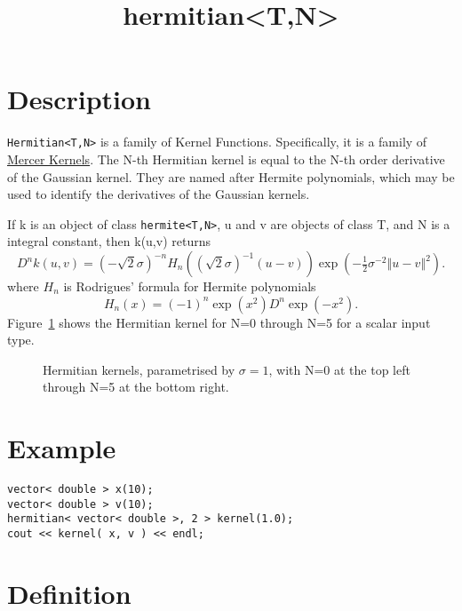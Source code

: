 \documentclass{article}
\newcommand{\half}{\tfrac{1}{2}}
\begin{document}
\title{hermitian<T,N>}
\maketitle

\section*{Description}

\texttt{Hermitian<T,N>} is a family of Kernel Functions. Specifically, it is a family of 
\href{\kmlroot/mercer_kernel.html}{Mercer Kernels}. 
The N-th Hermitian kernel is equal to the N-th order derivative of the Gaussian kernel. 
They are named after Hermite polynomials, which may be used to identify the derivatives of the Gaussian kernels. 

If k is an object of class \texttt{hermite<T,N>}, u and v are objects of class T, and N is a integral constant, then k(u,v) returns
%
\begin{equation}
D^{n}k(u,v)=(-\sqrt{2}\sigma)^{-n}H_{n}((\sqrt{2}\sigma)^{-1}(u-v))\exp(-\half\sigma^{-2}\left\Vert u-v\right\Vert^{2}).
\end{equation}
%
where $H_n$ is Rodrigues' formula for Hermite polynomials
\begin{equation}
H_{n}(x)=(-1)^{n}\exp(x^{2})D^{n}\exp(-x^{2}).
\end{equation}
%
Figure~\ref{figure:hermitian_kernel} shows the Hermitian kernel for N=0 through N=5 for a scalar input type.

\begin{figure}
\caption{Hermitian kernels, parametrised by $\sigma=1$, with N=0 at the top left through N=5 at the bottom right.}
\label{figure:hermitian_kernel}
\end{figure}


\section*{Example}


\highlightcpp{}
\begin{verbatim}
vector< double > x(10);
vector< double > v(10);
hermitian< vector< double >, 2 > kernel(1.0);
cout << kernel( x, v ) << endl;
\end{verbatim}


\section*{Definition}
\end{document}
